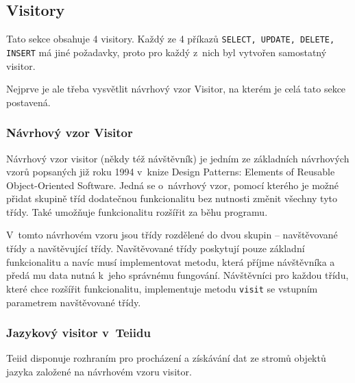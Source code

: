 \documentclass[oneside,12pt,final]{fithesis2}
\begin{document}
\subsection{Visitory}
\label{visitory}
Tato sekce obsahuje 4 visitory. Každý ze 4 příkazů \texttt{SELECT, UPDATE, DELETE, INSERT} má jiné požadavky, proto pro každý z~nich byl vytvořen samostatný visitor.

Nejprve je ale třeba vysvětlit návrhový vzor Visitor, na kterém je celá tato sekce postavená.
\subsubsection*{Návrhový vzor Visitor}

Návrhový vzor visitor (někdy též návštěvník) je jedním ze základních návrhových vzorů popsaných již roku 1994 v~knize Design Patterns: Elements of Reusable Object-Oriented Software. Jedná se o~návrhový vzor, pomocí kterého je možné přidat skupině tříd dodatečnou funkcionalitu bez nutnosti změnit všechny tyto třídy. Také umožňuje funkcionalitu rozšířit za běhu programu.

V~tomto návrhovém vzoru jsou třídy rozdělené do dvou skupin -- navštěvované třídy a navštěvující třídy. Navštěvované třídy poskytují pouze základní funkcionalitu a navíc musí implementovat metodu, která příjme návštěvníka a předá mu data nutná k~jeho správnému fungování. Návštěvníci pro každou třídu, které chce rozšířit funkcionalitu, implementuje metodu \texttt{visit} se vstupním parametrem navštěvované třídy.


\subsubsection*{Jazykový visitor v~Teiidu}
Teiid disponuje rozhraním pro procházení a získávání dat ze stromů objektů jazyka založené na návrhovém vzoru visitor.
\end{document}
